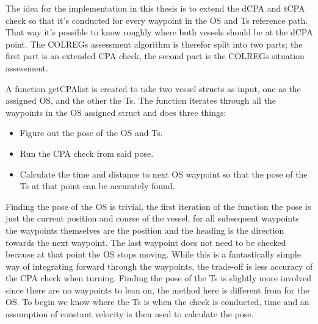 The idea for the implementation in this thesis is to extend the \gls{dCPA} and \gls{tCPA} check so that it's conducted for every waypoint in the \gls{OS} and \gls{Ts} reference path.
That way it's possible to know roughly where both vessels should be at the \gls{dCPA} point. The COLREGs assessment
algorithm is therefor split into two parts; the first part is an extended CPA check, the second part is the COLREGs situation assessment. 

A function getCPAlist is created to take two vessel structs as input, one as the assigned \gls{OS}, and the other the \gls{Ts}. The function iterates through all the waypoints
in the \gls{OS} assigned struct and does three things:
\begin{itemize}
    \item Figure out the pose of the \gls{OS} and \gls{Ts}.
    \item Run the CPA check from said pose.
    \item Calculate the time and distance to next \gls{OS} waypoint so that the pose of the \gls{Ts} at that point can be accurately found.
\end{itemize}
Finding the pose of the \gls{OS} is trivial, the first iteration of the function the pose is just the current position and course of the vessel, for all
subsequent waypoints the waypoints themselves are the position and the heading is the direction towards the next waypoint. The last waypoint does not need to be checked
because at that point the \gls{OS} stops moving. While this is a fantastically simple way of integrating forward through the waypoints, the trade-off is less accuracy of the CPA check
when turning. 
Finding the pose of the \gls{Ts} is slightly more involved since there are no waypoints to lean on, the method here is different from for the \gls{OS}.
To begin we know where the \gls{Ts} is when the check is conducted, time and an assumption of constant velocity is then used to calculate the pose.

